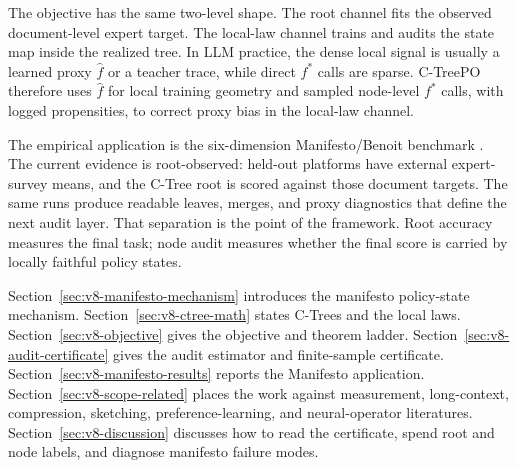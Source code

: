 The objective has the same two-level shape. The root channel fits the observed
document-level expert target. The local-law channel trains and audits the
state map inside the realized tree. In LLM practice, the dense local signal is
usually a learned proxy \(\widehat f\) or a teacher trace, while direct
\(f^\ast\) calls are sparse. C-TreePO therefore uses \(\widehat f\) for local
training geometry and sampled node-level \(f^\ast\) calls, with logged
propensities, to correct proxy bias in the local-law channel.

The empirical application is the six-dimension Manifesto/Benoit benchmark
\citep{BenoitEtAl2025}. The current evidence is root-observed: held-out
platforms have external expert-survey means, and the C-Tree root is scored
against those document targets. The same runs produce readable leaves, merges,
and proxy diagnostics that define the next audit layer. That separation is the
point of the framework. Root accuracy measures the final task; node audit
measures whether the final score is carried by locally faithful policy states.

Section~\ref{sec:v8-manifesto-mechanism} introduces the manifesto policy-state
mechanism. Section~\ref{sec:v8-ctree-math} states C-Trees and the local laws.
Section~\ref{sec:v8-objective} gives the objective and theorem ladder.
Section~\ref{sec:v8-audit-certificate} gives the audit estimator and
finite-sample certificate. Section~\ref{sec:v8-manifesto-results} reports the
Manifesto application. Section~\ref{sec:v8-scope-related} places the work
against measurement, long-context, compression, sketching, preference-learning,
and neural-operator literatures. Section~\ref{sec:v8-discussion} discusses
how to read the certificate, spend root and node labels, and diagnose
manifesto failure modes.
